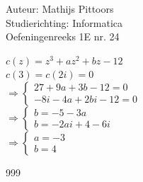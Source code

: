 \documentclass[a4paper]{article}
\begin{document}
  
\noindent \large Auteur: Mathijs Pittoors \\
\noindent \large Studierichting: Informatica\\
\noindent \large Oefeningenreeks 1E nr. 24\\

\medskip

\normalsize

$c(z) =  z^3 + az^2 + bz - 12$\\

$c(3) = c(2i) = 0$\\

$\Rightarrow\left\{
	\begin{array}{l}
		27+9 a+3 b-12=0 \\
		-8 i-4 a+2 b i-12=0
	\end{array}
\right .$\\

$\Rightarrow\left\{
	\begin{array}{l}
		b=-5-3 a \\
		b=-2 a i+4-6 i
	\end{array}
\right .$\\
    
    

$\Rightarrow\left\{
	\begin{array}{l}
		a=-3 \\
		b=4
	\end{array}
\right .$\\



\begin{thebibliography}{999}
\end{thebibliography}
\end{document}
